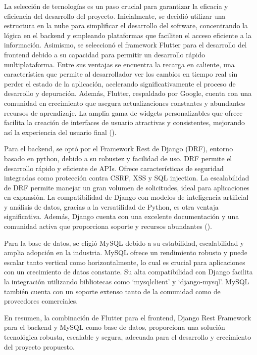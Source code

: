 La selección de tecnologías es un paso crucial para garantizar la eficacia y eficiencia del desarrollo del proyecto. Inicialmente, se decidió utilizar una estructura en la nube para simplificar el desarrollo del software, concentrando la lógica en el backend y empleando plataformas que faciliten el acceso eficiente a la información. Asimismo, se seleccionó el framework Flutter para el desarrollo del frontend debido a su capacidad para permitir un desarrollo rápido multiplataforma. Entre sus ventajas se encuentra la recarga en caliente, una característica que permite al desarrollador ver los cambios en tiempo real sin perder el estado de la aplicación, acelerando significativamente el proceso de desarrollo y depuración. Además, Flutter, respaldado por Google, cuenta con una comunidad en crecimiento que asegura actualizaciones constantes y abundantes recursos de aprendizaje. La amplia gama de widgets personalizables que ofrece facilita la creación de interfaces de usuario atractivas y consistentes, mejorando así la experiencia del usuario final (\cite{tyagi2021pragmatic}).

Para el backend, se optó por el Framework Rest de Django (DRF), entorno basado en python, debido a su robustez y facilidad de uso. DRF permite el desarrollo rápido y eficiente de APIs. Ofrece características de seguridad integradas como protección contra CSRF, XSS y SQL injection. La escalabilidad de DRF permite manejar un gran volumen de solicitudes, ideal para aplicaciones en expansión. La compatibilidad de Django con modelos de inteligencia artificial y análisis de datos, gracias a la versatilidad de Python, es otra ventaja significativa. Además, Django cuenta con una excelente documentación y una comunidad activa que proporciona soporte y recursos abundantes (\cite{vincent2022django}).

Para la base de datos, se eligió MySQL debido a su estabilidad, escalabilidad y amplia adopción en la industria. MySQL ofrece un rendimiento robusto y puede escalar tanto vertical como horizontalmente, lo cual es crucial para aplicaciones con un crecimiento de datos constante. Su alta compatibilidad con Django facilita la integración utilizando bibliotecas como `mysqlclient' y `django-mysql'. MySQL también cuenta con un soporte extenso tanto de la comunidad como de proveedores comerciales.

En resumen, la combinación de Flutter para el frontend, Django Rest Framework para el backend y MySQL como base de datos, proporciona una solución tecnológica robusta, escalable y segura, adecuada para el desarrollo y crecimiento del proyecto propuesto.


